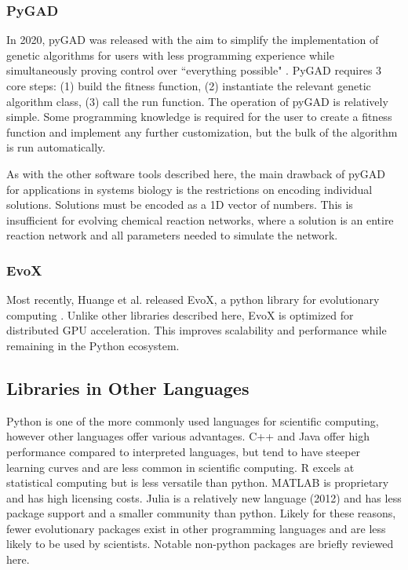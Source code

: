 \documentclass[12pt]{report}
\begin{document}
\subsubsection{PyGAD}
In 2020, pyGAD was released with the aim to simplify the implementation of genetic algorithms for users with less programming experience while simultaneously proving control over ``everything possible" \cite{gad2023pygad}. PyGAD requires 3 core steps: (1) build the fitness function, (2) instantiate the relevant genetic algorithm class, (3) call the run function. The operation of pyGAD is relatively simple. Some programming knowledge is required for the user to create a fitness function and implement any further customization, but the bulk of the algorithm is run automatically. 

As with the other software tools described here, the main drawback of pyGAD for applications in systems biology is the restrictions on encoding individual solutions. Solutions must be encoded as a 1D vector of numbers. This is insufficient for evolving chemical reaction networks, where a solution is an entire reaction network and all parameters needed to simulate the network.

\subsubsection{EvoX}
Most recently, Huange et al. released EvoX, a python library for evolutionary computing \cite{Huang2024}. Unlike other libraries described here, EvoX is optimized for distributed GPU acceleration. This improves scalability and performance while remaining in the Python ecosystem.

\subsection{Libraries in Other Languages}
Python is one of the more commonly used languages for scientific computing, however other languages offer various advantages. C++ and Java offer high performance compared to interpreted languages, but tend to have steeper learning curves and are less common in scientific computing. R excels at statistical computing but is less versatile than python. MATLAB is proprietary and has high licensing costs. Julia is a relatively new language (2012) and has less package support and a smaller community than python. Likely for these reasons, fewer evolutionary packages exist in other programming languages and are less likely to be used by scientists. Notable non-python packages are briefly reviewed here.
\end{document}
